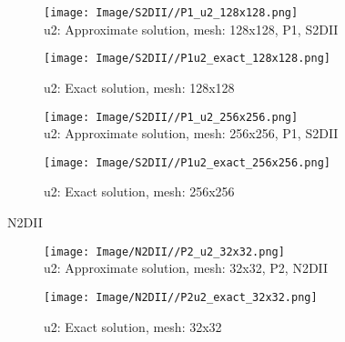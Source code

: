 \documentclass[a4paper,11pt]{article}
\begin{document}
\begin{figure}[bhtp]
  \hspace{35.pt}
  \begin{minipage}[t]{0.4 \textwidth}
    \centering
    \texttt{[image: Image/S2DII//P1\_u2\_128x128.png]}\\
    \caption{u2: Approximate solution, mesh: 128x128, P1, S2DII}\label{fig:fig_P2_u2_128x128}
  \end{minipage}
  \hspace{0.1in}
  \begin{minipage}[t]{0.4 \textwidth}
    \centering
    \texttt{[image: Image/S2DII//P1u2\_exact\_128x128.png]}\\
    \caption{u2: Exact solution, mesh: 128x128}\label{fig:fig_P2u2_exact_128x128}
  \end{minipage}
\end{figure}
\newpage
\begin{figure}[bhtp]
  \hspace{35.pt}
  \begin{minipage}[t]{0.4 \textwidth}
    \centering
    \texttt{[image: Image/S2DII//P1\_u2\_256x256.png]}\\
    \caption{u2: Approximate solution, mesh: 256x256, P1, S2DII}\label{fig:fig_P2_u2_256x256}
  \end{minipage}
  \hspace{0.1in}
  \begin{minipage}[t]{0.4 \textwidth}
    \centering
    \texttt{[image: Image/S2DII//P1u2\_exact\_256x256.png]}\\
    \caption{u2: Exact solution, mesh: 256x256}\label{fig:fig_P2u2_exact_256x256}
  \end{minipage}
\end{figure}
N2DII
\begin{figure}[bhtp]
  \hspace{35.pt}
  \begin{minipage}[t]{0.4 \textwidth}
    \centering
    \texttt{[image: Image/N2DII//P2\_u2\_32x32.png]}\\
    \caption{u2: Approximate solution, mesh: 32x32, P2, N2DII}\label{fig:fig_P2_u2_32-32}
  \end{minipage}
  \hspace{0.1in}
  \begin{minipage}[t]{0.4 \textwidth}
    \centering
    \texttt{[image: Image/N2DII//P2u2\_exact\_32x32.png]}\\
    \caption{u2: Exact solution, mesh: 32x32}\label{fig:fig_P2u2_exact_32-32}
  \end{minipage}
\end{figure}
\end{document}
